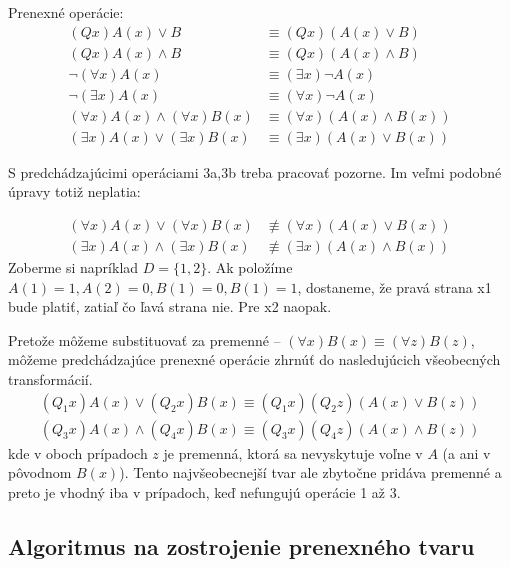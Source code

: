 \medskip
Prenexné operácie:
\begin{align*}
    (Qx)A(x) \lor B &\equiv (Qx)(A(x) \lor B) \tag{1a}\\
    (Qx)A(x) \land B &\equiv (Qx)(A(x) \land B) \tag{1b}\\
    \neg (\forall x) A(x) &\equiv (\exists x) \neg A(x) \tag{2a}\\
    \neg (\exists x) A(x) &\equiv (\forall x) \neg A(x) \tag{2b}\\
    (\forall x) A(x) \land (\forall x) B(x) &\equiv 
        (\forall x) (A(x) \land B(x)) \tag{3a}\\
    (\exists x) A(x) \lor (\exists x) B(x) &\equiv
        (\exists x) (A(x) \lor B(x)) \tag{3b}
\end{align*}
\begin{poznamka}
    S predchádzajúcimi operáciami 3a,3b treba pracovať pozorne. Im veľmi
    podobné úpravy totiž neplatia:

    \begin{align*}
      (\forall x) A(x) \lor (\forall x) B(x)  & \not \equiv
        (\forall x) (A(x) \lor B(x)) \tag{x1}\\
      (\exists x) A(x) \land (\exists x) B(x) & \not \equiv
        (\exists x) (A(x) \land B(x)) \tag{x2}
    \end{align*}
    Zoberme si napríklad $D=\{1,2\}$. Ak položíme
    $A(1)=1, A(2)=0, B(1)=0, B(1)=1$, dostaneme, že pravá strana x1 bude
    platiť, zatiaľ čo ľavá strana nie. Pre x2 naopak.
\end{poznamka}

Pretože môžeme substituovať za premenné --
    $(\forall x) B(x) \equiv (\forall z) B(z)$, môžeme predchádzajúce
prenexné operácie zhrnúť do nasledujúcich všeobecných transformácií.
\begin{align*}
    (Q_1 x)A(x) \lor (Q_2 x)B(x) \equiv 
        (Q_1 x)(Q_2 z)(A(x) \lor B(z)) \tag{4a} \\
    (Q_3 x)A(x) \land (Q_4 x)B(x) \equiv
        (Q_3 x)(Q_4 z)(A(x) \land B(z)) \tag{4b}
\end{align*} 
kde v oboch prípadoch $z$ je premenná, ktorá sa nevyskytuje voľne v $A$
(a ani v pôvodnom $B(x)$).
Tento najvšeobecnejší tvar ale zbytočne pridáva premenné a preto je
vhodný iba v prípadoch, keď nefungujú operácie 1 až 3.

\subsection{Algoritmus na zostrojenie prenexného tvaru}


